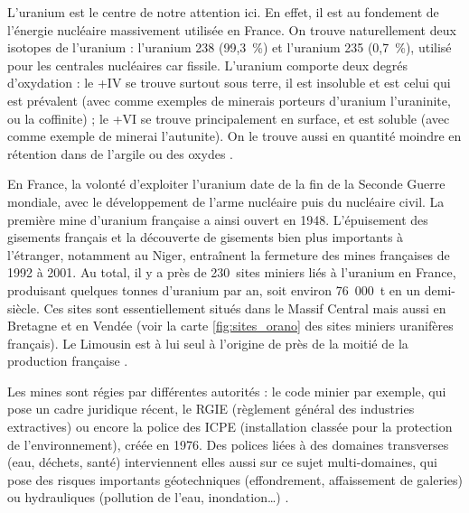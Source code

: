 \documentclass{article}
\begin{document}
L’uranium est le centre de notre attention ici. En effet, il est au fondement de l’énergie nucléaire massivement utilisée en France. On trouve naturellement deux isotopes de l'uranium : l'uranium 238 (99,3~\%) et l'uranium 235 (0,7~\%), utilisé pour les centrales nucléaires car fissile. L'uranium comporte deux degrés d’oxydation : le +IV se trouve surtout sous terre, il est insoluble et est celui qui est prévalent (avec comme exemples de minerais porteurs d'uranium l'uraninite, ou la coffinite) ; le +VI se trouve principalement en surface, et est soluble (avec comme exemple de minerai l'autunite). On le trouve aussi en quantité moindre en rétention dans de l’argile ou des oxydes \cite{descostes_introduction_2020}.


En France, la volonté d’exploiter l’uranium date de la fin de la Seconde Guerre mondiale, avec le développement de l'arme nucléaire puis du nucléaire civil. La première mine d’uranium française a ainsi ouvert en 1948. L’épuisement des gisements français et la découverte de gisements bien plus importants à l’étranger, notamment au Niger, entraînent la fermeture des mines françaises de 1992 à 2001. Au total, il y a près de 230~sites miniers liés à l’uranium en France, produisant quelques tonnes d'uranium par an, soit environ 76~000~t en un demi-siècle. Ces sites sont essentiellement situés dans le Massif Central mais aussi en Bretagne et en Vendée (voir la carte \ref{fig:sites_orano} des sites miniers uranifères français). Le Limousin est à lui seul à l’origine de près de la moitié de la production française \cite{descostes_introduction_2020}.

Les mines sont régies par différentes autorités : le code minier par exemple, qui pose un cadre juridique récent, le RGIE (règlement général des industries extractives) ou encore la police des ICPE (installation classée pour la protection de l’environnement), créée en 1976. Des polices liées à des domaines transverses (eau, déchets, santé) interviennent elles aussi sur ce sujet multi-domaines, qui pose des risques importants géotechniques (effondrement, affaissement de galeries) ou hydrauliques (pollution de l'eau, inondation…) \cite{dublineau_gestion_2020}\cite{ledoux_notions_2020}\cite{raimbault_mine_2020}.
\end{document}
